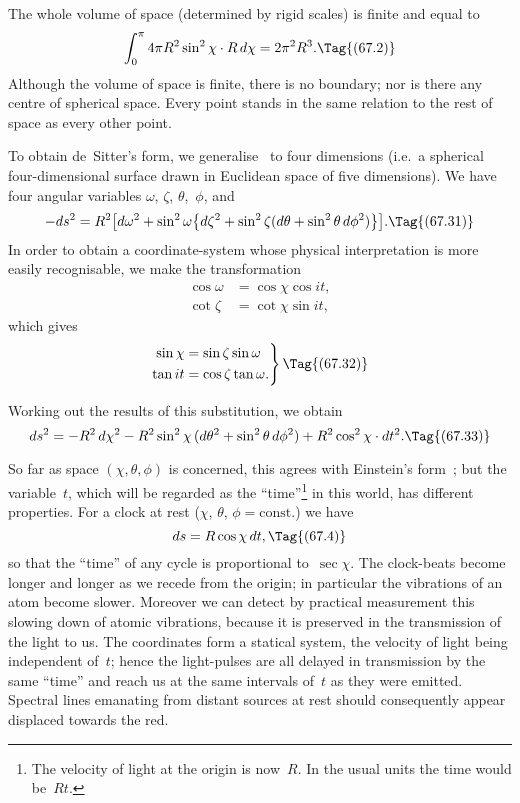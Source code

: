 \documentclass[12pt]{book}
\begin{document}
The whole volume of space (determined by rigid scales) is finite and equal
to
\[
\int_{0}^{\pi} 4\pi R^{2} \sin^{2}\chi \cdot R\, d\chi = 2\pi^{2} R^{3}.
\Tag{(67.2)}
\]
Although the volume of space is finite, there is no boundary; nor is there any
centre of spherical space. Every point stands in the same relation to the rest
of space as every other point.

To obtain de~Sitter's form, we generalise~ to four dimensions (i.e.\ a
spherical four\hyp{}dimensional surface drawn in Euclidean space of five dimensions).
We have four angular variables $\omega$, $\zeta$, $\theta$,~$\phi$, and
\[
-ds^{2} = R^{2} \bigl[d\omega^2
  + \sin^{2}\omega \bigl\{d\zeta^2
  + \sin^{2}\zeta (d\theta + \sin^{2}\theta\, d\phi^{2})\bigr\}\bigr].
\Tag{(67.31)}
\]
In order to obtain a coordinate\hyp{}system whose physical interpretation is more
easily recognisable, we make the transformation
\begin{align*}
  \cos\omega &= \cos\chi \cos it, \\
  \cot\zeta &= \cot\chi \sin it,
\end{align*}
which gives
\[
\left.
\begin{aligned}
  \sin\chi &= \sin\zeta \sin\omega\\
  \tan it &= \cos\zeta \tan\omega.
\end{aligned}
\right\}
\Tag{(67.32)}
\]

Working out the results of this substitution, we obtain
\[
ds^{2} = -R^{2}\, d\chi^{2} - R^{2} \sin^{2}\chi\, (d\theta^2 + \sin^{2}\theta\, d\phi^{2})
+ R^{2} \cos^{2}\chi \cdot dt^{2}.
\Tag{(67.33)}
\]

So far as space $(\chi, \theta, \phi)$ is concerned, this agrees with Einstein's form~;
but the variable~$t$, which will be regarded as the ``time''\footnote
  {The velocity of light at the origin is now~$R$. In the usual units the time would be~$Rt$.}
in this
world, has different properties. For a clock at rest ($\chi$, $\theta$, $\phi = \text{const.}$) we have
\[
ds = R\cos\chi\, dt,
\Tag{(67.4)}
\]
%
%
%
so that the ``time'' of any cycle is proportional to~$\sec\chi$. The clock-beats
become longer and longer as we recede from the origin; in particular the
vibrations of an atom become slower. Moreover we can detect by practical
measurement this slowing down of atomic vibrations, because it is preserved
in the transmission of the light to us. The coordinates  form a statical
system, the velocity of light being independent of~$t$; hence the light\hyp{}pulses
are all delayed in transmission by the same ``time'' and reach us at the same
intervals of~$t$ as they were emitted. Spectral lines emanating from distant
%
%
%
sources at rest should consequently appear displaced towards the red.
\end{document}
